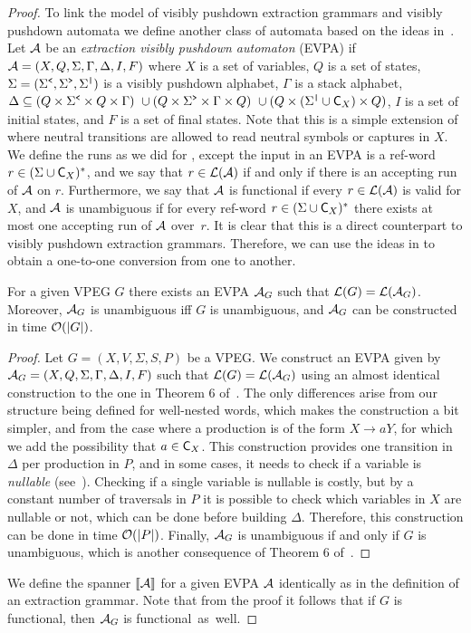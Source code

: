 
\begin{proof}
	
	To link the model of visibly pushdown extraction grammars and visibly pushdown automata we define another class of automata based on the ideas in~\cite{liatpaper}. Let $\mathcal{A}$ be an {\em extraction visibly pushdown automaton} (EVPA) if \linebreak $\mathcal{A} = (X,Q,\Sigma,\Gamma,\Delta,I,F)$ where $X$ is a set of variables, $Q$ is a set of states, $\Sigma = (\Sigma^{\texttt{<}},\Sigma^{\texttt{>}},\Sigma^{\texttt{|}})$ is a visibly pushdown alphabet, $\Gamma$ is a stack alphabet, $\Delta \subseteq
	(Q \times \Sigma^{\texttt{<}} \times Q \times \Gamma) \ \cup (Q \times \Sigma^{\texttt{>}} \times \Gamma \times Q) \ \cup (Q \times (\Sigma^{\texttt{|}}\cup\textsf{C}_{X}) \times Q)$, $I$ is a set of initial states, and $F$ is a set of final states. Note that this is a simple extension of \vpa where neutral transitions are allowed to read neutral symbols or captures in $X$. 
	We define the runs as we did for \vpa, except the input in an EVPA is a ref-word $r\in(\Sigma\cup\textsf{C}_{X})^*$, and we say that $r\in\mathcal{L}(\mathcal{A})$ if and only if there is an accepting run of $\mathcal{A}$ on $r$. Furthermore, we say that $\mathcal{A}$ is functional if every $r\in\mathcal{L}(\mathcal{A})$ is valid for $X$, and $\mathcal{A}$ is unambiguous if for every ref-word $r\in (\Sigma\cup\textsf{C}_{X})^*$ there exists at most one accepting run of $\mathcal{A}$ over~$r$. It is clear that this is a direct counterpart to visibly pushdown extraction grammars. Therefore, we can use the ideas in \cite{AlurM04} to obtain a one-to-one conversion from one to another.
	
	\begin{claim}\label{nested:appendix:spannerclaim}
		For a given VPEG $G$ there exists an EVPA $\mathcal{A}_G$ such that $\mathcal{L}(G) = \mathcal{L}(\mathcal{A}_G)$. Moreover, $\mathcal{A}_G$ is unambiguous iff $G$ is unambiguous, and $\mathcal{A}_G$ can be constructed in time $\mathcal{O}(\vert G\vert)$.
	\end{claim}
	\begin{proof}
		Let $G = (X, V, \Sigma, S, P)$ be a VPEG. We construct an EVPA given by $\mathcal{A}_G = (X,Q,\Sigma,\Gamma,\Delta,I,F)$ such that $\mathcal{L}(G) = \mathcal{L}(\mathcal{A}_G)$ using an almost identical construction to the one in Theorem 6 of~\cite{AlurM04}. The only differences arise from our structure being defined for well-nested words, which makes the construction a bit simpler, and from the case where a production is of the form $X\to aY$, for which we add the possibility that $a\in\textsf{C}_{X}$. This construction provides one transition in $\Delta$ per production in $P$, and in some cases, it needs to check if a variable is {\it nullable} (see~\cite{AlurM04}). Checking if a single variable is nullable is costly, but by a constant number of traversals in $P$ it is possible to check which variables in $X$ are nullable or not, which can be done before building $\Delta$. Therefore, this construction can be done in time $\mathcal{O}(\vert P\vert)$. Finally, $\mathcal{A}_G$ is unambiguous if and only if $G$ is unambiguous, which is another consequence of Theorem 6 of~\cite{AlurM04}.	
	\end{proof}
	We define the spanner $\llbracket \mathcal{A} \rrbracket$ for a given EVPA $\mathcal{A}$ identically as in the definition of an extraction grammar. Note that from the proof it follows that if $G$ is functional, then $\mathcal{A}_G$ is functional~as~well.
	

\end{proof}
